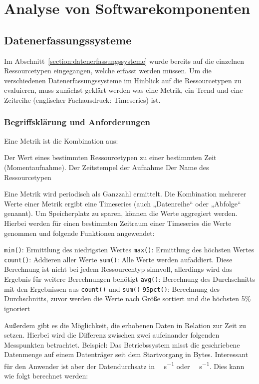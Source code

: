 {\chapter{Analyse von Softwarekomponenten}
\section{Datenerfassungssysteme}
Im Abschnitt~\ref{section:datenerfassungssysteme} wurde bereits auf die
einzelnen Ressourcetypen eingegangen, welche erfasst werden müssen. Um die
verschiedenen Datenerfassungssysteme im Hinblick auf die Ressourcetypen zu
evaluieren, muss zunächst geklärt werden was eine Metrik, ein Trend und eine
Zeitreihe (englischer Fachausdruck: Timeseries) ist.
\tm%

\subsection{Begriffsklärung und Anforderungen}
\label{section:Begriffserklärung}
Eine Metrik ist die Kombination aus:

\begin{outline}
  \1 Der Wert eines bestimmten Ressourcetypen zu einer bestimmten Zeit
  (Momentaufnahme).
  \1 Der Zeitstempel der Aufnahme
  \1 Der Name des Ressourcetypen
\end{outline}

Eine Metrik wird periodisch als Ganzzahl ermittelt. Die Kombination mehrerer
Werte einer Metrik ergibt eine Timeseries (auch „Datenreihe“ oder „Abfolge“
genannt). Um Speicherplatz zu sparen, können die Werte aggregiert werden.
Hierbei werden für einen bestimmten Zeitraum einer Timeseries die Werte
genommen und folgende Funktionen angewendet:

\begin{outline}
  \1 \lstinline|min()|: Ermittlung des niedrigsten Wertes
  \1 \lstinline|max()|: Ermittlung des höchsten Wertes
  \1 \lstinline|count()|: Addieren aller Werte
  \1 \lstinline|sum()|: Alle Werte werden aufaddiert. Diese Berechnung ist
  nicht bei jedem Ressourcentyp sinnvoll, allerdings wird das Ergebnis für
  weitere Berechnungen benötigt
  \1 \lstinline|avg()|: Berechnung des Durchschnitts mit den Ergebnissen aus
  \lstinline|count()| und \lstinline|sum()|
  \1 \lstinline|95pct()|: Berechnung des Durchschnitts, zuvor werden die Werte
  nach Größe sortiert und die höchsten 5\% ignoriert
\end{outline}

Außerdem gibt es die Möglichkeit, die erhobenen Daten in Relation zur Zeit zu
setzen. Hierbei wird die Differenz zwischen zwei aufeinander folgenden
Messpunkten betrachtet.  Beispiel: Das Betriebssystem misst die geschriebene
Datenmenge auf einem Datenträger seit dem Startvorgang in Bytes. Interessant
für den Anwender ist aber der Datendurchsatz in \si{\mega\byte\per\second} oder
\si{\giga\byte\per\second}. Dies kann wie folgt berechnet werden:

}
